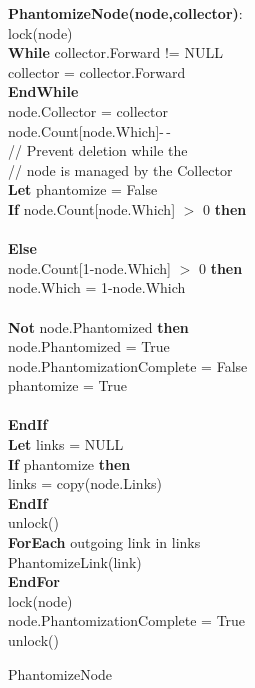 \begin{algorithm}[ht]
{\small
{\bf PhantomizeNode(node,collector)}:\\
{\Indp
{lock(node)}\\
{\bf While} collector.Forward != NULL\\
\quad collector = collector.Forward\\
{\bf EndWhile}\\
node.Collector = collector\\
node.Count[node.Which]-\,-\\
\quad // Prevent deletion while the\\
\quad // node is managed by the Collector\\
{\bf Let} phantomize = False\\
{\bf If} node.Count[node.Which] $>$ 0 {\bf then}\\
\\
{\bf Else}\\
 node.Count[1-node.Which] $>$ 0 {\bf then}\\
\quad \quad node.Which = 1-node.Which\\
\\
 {\bf Not} node.Phantomized {\bf then}\\
\quad \quad node.Phantomized = True\\
\quad \quad node.PhantomizationComplete = False\\
\quad \quad phantomize = True\\
\\

{\bf EndIf}\\
{\bf Let} links = NULL \\
{\bf If} phantomize {\bf then}\\
\quad links = copy(node.Links)\\
{\bf EndIf}\\
{unlock()}\\
{\bf ForEach} outgoing link in links\\
\quad PhantomizeLink(link)\\
{\bf EndFor}\\
lock(node)\\
{node.PhantomizationComplete = True}\\
unlock()\\
}
}
\caption{PhantomizeNode}
\label{algorithm:phantomizenode}
\end{algorithm}
